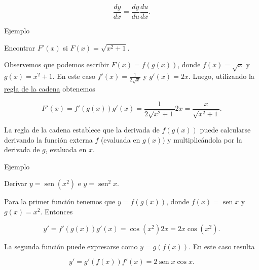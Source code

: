 \documentclass[
  letterpaper,
]{book}
\theoremstyle{plain}
\theoremstyle{remark}
\begin{document}
\[
\frac{dy}{dx}=\frac{dy}{du}\frac{du}{dx}.
\]

Ejemplo

Encontrar \(F'(x)\) si \(F(x)=\sqrt{x^2+1}\).

\begin{tcolorbox}[enhanced jigsaw, opacityback=0, left=2mm, opacitybacktitle=0.6, toprule=.15mm, bottomrule=.15mm, colbacktitle=quarto-callout-tip-color!10!white, titlerule=0mm, bottomtitle=1mm, title=\textcolor{quarto-callout-tip-color}{\faLightbulb}\hspace{0.5em}{Solución}, toptitle=1mm, colframe=quarto-callout-tip-color-frame, colback=white, breakable, rightrule=.15mm, arc=.35mm, leftrule=.75mm, coltitle=black]

Observemos que podemos escribir \(F(x)=f(g(x))\), donde
\(f(x)=\sqrt{x}\) y \(g(x)=x^2+1\). En este caso
\(f'(x)=\frac{1}{2\sqrt{x}}\) y \(g'(x)=2x\). Luego, utilizando la
\hyperref[teo-regla-cadena]{regla de la cadena} obtenemos

\[
F'(x)=f'(g(x))g'(x)=\frac{1}{2\sqrt{x^2+1}} 2x =\frac{x}{\sqrt{x^2+1}}.
\]

\end{tcolorbox}

La regla de la cadena establece que la derivada de \(f(g(x))\) puede
calcularse derivando la función externa \(f\) (evaluada en \(g(x)\)) y
multiplicándola por la derivada de \(g\), evaluada en \(x\).

Ejemplo

Derivar \(y=\operatorname{sen}(x^2)\) e \(y=\operatorname{sen}^2x\).

\begin{tcolorbox}[enhanced jigsaw, opacityback=0, left=2mm, opacitybacktitle=0.6, toprule=.15mm, bottomrule=.15mm, colbacktitle=quarto-callout-tip-color!10!white, titlerule=0mm, bottomtitle=1mm, title=\textcolor{quarto-callout-tip-color}{\faLightbulb}\hspace{0.5em}{Solución}, toptitle=1mm, colframe=quarto-callout-tip-color-frame, colback=white, breakable, rightrule=.15mm, arc=.35mm, leftrule=.75mm, coltitle=black]

Para la primer función tenemos que \(y=f(g(x))\), donde
\(f(x)=\operatorname{sen} x\) y \(g(x)=x^2\). Entonces

\[
y'=f'(g(x))g'(x)=\cos(x^2)2x=2x\cos(x^2).
\]

La segunda función puede expresarse como \(y=g(f(x))\). En este caso
resulta

\[
y'=g'(f(x))f'(x)=2\operatorname{sen} x \cos x.
\]

\end{tcolorbox}
\end{document}
